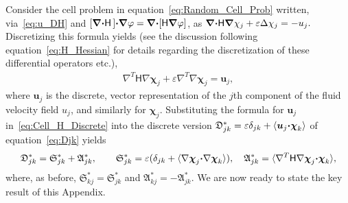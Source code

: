 \documentclass[english,12pt,jmp,graphicx]{revtex4-1}
\newcommand{\vecu}{\boldsymbol{u}}
\newcommand{\bnabla}{\mbox{\boldmath${\nabla}$}}
\newcommand{\bcdot}{\mbox{\boldmath${\cdot}$}}
\newcommand{\Sg}{\mathfrak{S}}
\newcommand{\Ag}{\mathfrak{A}}
\newcommand{\Dg}{\mathfrak{D}}
\newcommand{\vecchi}{\boldsymbol{\chi}}
\newcommand{\Hm}{\mathsf{H}}
\begin{document}
Consider the cell problem in
equation~\eqref{eq:Random_Cell_Prob} 
written, via~\eqref{eq:u_DH} and 
$[\bnabla\bcdot\Hm\,]\bcdot\bnabla\varphi =\bnabla\bcdot[\Hm\bnabla\varphi]$,
as $\bnabla\bcdot\Hm\bnabla\chi_j+\varepsilon\Delta\chi_j=-u_j.$
Discretizing
this formula yields
(see the discussion following equation~\eqref{eq:H_Hessian} for
details regarding the discretization of these differential operators
etc.), 
%
\begin{align}\label{eq:Cell_H_Discrete}
  \nabla^T\Hm\nabla\vecchi_j+\varepsilon\nabla^T\nabla\vecchi_j=\vecu_j,
\end{align}
%
where $\vecu_j$ is the discrete, vector representation of the $j$th
component of the fluid velocity field $u_j$, and similarly for $\vecchi_j$. 
Substituting the formula for $\vecu_j$ in~\eqref{eq:Cell_H_Discrete}
into the discrete version $\Dg^*_{jk}=\varepsilon\delta_{jk}+\langle\vecu_j\bcdot\vecchi_k\rangle$
of equation~\eqref{eq:Djk} yields    
%
\begin{align}\label{eq:Discrete_Djk}
  \Dg^*_{jk}=\Sg^*_{jk}+\Ag^*_{jk},
  \qquad
  \Sg^*_{jk}=\varepsilon(\delta_{jk}+\langle\nabla\vecchi_j\bcdot\nabla\vecchi_k\rangle),
  \quad
  \Ag^*_{jk}=\langle\nabla^T\Hm\nabla\vecchi_j\bcdot\vecchi_k\rangle,
\end{align}
%
where, as before, $\Sg^*_{kj}=\Sg^*_{jk}$ and
$\Ag^*_{kj}=-\Ag^*_{jk}$. We are now ready to state
the key result of this Appendix.
\end{document}
